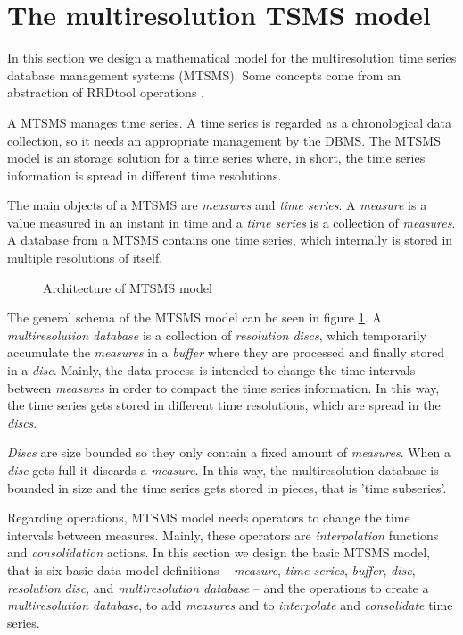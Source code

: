 \section{The multiresolution TSMS model}
\label{sec:MTSMS}

In this section we design a mathematical model for the multiresolution time series database management systems (MTSMS). Some concepts come from an abstraction of RRDtool operations \cite{rrdtool}. 

A MTSMS manages time series. A time series is regarded as a chronological data collection, so it needs an appropriate management by the DBMS.
The MTSMS model is an storage solution for a time series where, in short,  the time series information is spread in different time resolutions. 

The main objects of a MTSMS are \emph{measures} and \emph{time series}. A \emph{measure} is a value measured in an instant in time and a  \emph{time series} is a collection of \emph{measures}. A database from a MTSMS contains one time series, which internally is stored in multiple resolutions of itself.

\begin{figure}[tp]
\centering
\setlength{\unitlength}{0.3mm}

\caption{Architecture of MTSMS model}
\label{fig:model:mtsdb}
\end{figure}

The general schema of the MTSMS model can be seen in figure \ref{fig:model:mtsdb}.  A \emph{multiresolution database} is a collection of \emph{resolution discs}, which temporarily accumulate the \emph{measures} in a \emph{buffer} where they are processed and finally stored in a \emph{disc}. Mainly, the data process is intended to change the time intervals between \emph{measures} in order to compact the time series information. In this way, the time series gets stored in different time resolutions, which are spread in the \emph{discs}.

\emph{Discs} are size bounded so they only contain a fixed amount of \emph{measures}. When a \emph{disc} gets full it discards a \emph{measure}. In this way, the multiresolution database is bounded in size and the time series gets stored in pieces, that is 'time subseries'.







Regarding operations, MTSMS model needs operators to change the time intervals between measures. Mainly, these operators are \emph{interpolation} functions and \emph{consolidation} actions. In this section we design the basic MTSMS model, that is six basic data model definitions -- \emph{measure}, \emph{time series}, \emph{buffer}, \emph{disc}, \emph{resolution disc}, and \emph{multiresolution database} -- and the operations to create a \emph{multiresolution database}, to add \emph{measures} and to \emph{interpolate} and \emph{consolidate} time series.







